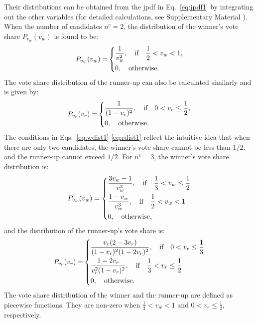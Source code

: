 \documentclass[reprint, pre, twocolumn, aps, showpacs, superscriptaddress]{revtex4-2}
\begin{document}
Their distributions can be obtained from the jpdf in Eq.~\ref{eq:jpdf1} by integrating out the other variables (for detailed calculations, see Supplementary Material \cite{supp}). When the number of candidates $n^c = 2$, the distribution of the winner's vote share $P_{v_w}(v_w)$ is found to be:
\begin{equation}
{P_{v_w}(v_w) = }
\begin{dcases}
     \frac{1}{v_w^2}, ~~\text{ if } ~~ \frac{1}{2} < v_w < 1,\\
     0, ~~\text{ otherwise}.
\end{dcases}
\label{eq:wdist1}
\end{equation}
The vote share distribution of the runner-up can also be calculated similarly and is given by:
\begin{equation}
{P_{v_r}(v_r) = }
\begin{dcases}
     \frac{1}{(1- v_r)^2}, ~~\text{ if } ~~ 0 < v_r \leq \frac{1}{2},\\
     0, ~~\text{ otherwise}.
\end{dcases}
\label{eq:rdist1}
\end{equation}
The conditions in Eqs.~\ref{eq:wdist1}-\ref{eq:rdist1} reflect the intuitive idea that when there are only two candidates, the winner's vote share cannot be less than $1/2$, and the runner-up cannot exceed $1/2$. For $n^c = 3$, the winner's vote share distribution is:
\begin{equation}
P_{v_w}(v_w) = 
\begin{dcases}
     \frac{3v_w - 1}{ v_w^3}, ~~\text{ if } ~~\frac{1}{3} < v_w \leq \frac{1}{2}\\
     \frac{1 - v_w}{v_w^3}, ~~\text{ if } ~~\frac{1}{2} < v_w < 1\\
     0, ~~\text{ otherwise},
\end{dcases}
\end{equation}
and the distribution of the runner-up's vote share is:
\begin{equation}
{P_{v_r}(v_r) = }
\begin{dcases}
    \frac{v_r (2 - 3 v_r)}{(1 - v_r)^2 (1 - 2 v_r)^2}, ~~\text{ if } ~~ 0 < v_r \leq \frac{1}{3}\\
    \frac{1 - 2 v_r}{v_r^2(1 - v_r)^2}, ~~\text{ if } ~~ \frac{1}{3} < v_r \leq \frac{1}{2}\\
     0, ~~ \text{ otherwise}.
\end{dcases}
\end{equation}
The vote share distribution of the winner and the runner-up are defined as piecewise functions. They are non-zero when $\frac{1}{3} < v_w < 1$ and $0 < v_r \leq \frac{1}{2}$, respectively.
\end{document}
